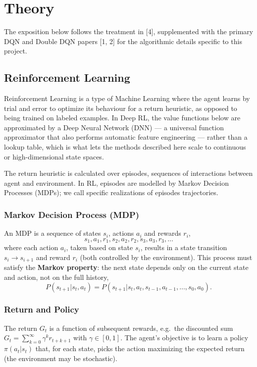 \section{Theory}
The exposition below follows the treatment in [4], supplemented with the primary DQN and Double DQN papers [1, 2] for the algorithmic details specific to this project.

\subsection{Reinforcement Learning}

Reinforcement Learning is a type of Machine Learning where the agent learns by trial and error to optimize its behaviour for a return heuristic, as opposed to being trained on labeled examples. In Deep RL, the value functions below are approximated by a Deep Neural Network (DNN) — a universal function approximator that also performs automatic feature engineering — rather than a lookup table, which is what lets the methods described here scale to continuous or high-dimensional state spaces.

The return heuristic is calculated over episodes, sequences of interactions between agent and environment. In RL, episodes are modelled by Markov Decision Processes (MDPs); we call specific realizations of episodes trajectories.

\subsubsection{Markov Decision Process (MDP)}

An MDP is a sequence of states $s_i$, actions $a_i$ and rewards $r_i$,
\[
s_1, a_1, r_1, s_2, a_2, r_2, s_3, a_3, r_3, \dots
\]
where each action $a_i$, taken based on state $s_i$, results in a state transition $s_i \rightarrow s_{i+1}$ and reward $r_i$ (both controlled by the environment). This process must satisfy the \textbf{Markov property}: the next state depends only on the current state and action, not on the full history,
\[
P(s_{t+1} | s_t, a_t) = P(s_{t+1} | s_t, a_t, s_{t-1}, a_{t-1}, \dots, s_0, a_0).
\]

\subsubsection{Return and Policy}

The return $G_t$ is a function of subsequent rewards, e.g.\ the discounted sum $G_t = \sum_{k=0}^{\infty} \gamma^k r_{t+k+1}$ with $\gamma \in [0, 1]$. The agent's objective is to learn a policy $\pi(a_t|s_t)$ that, for each state, picks the action maximizing the expected return (the environment may be stochastic).

